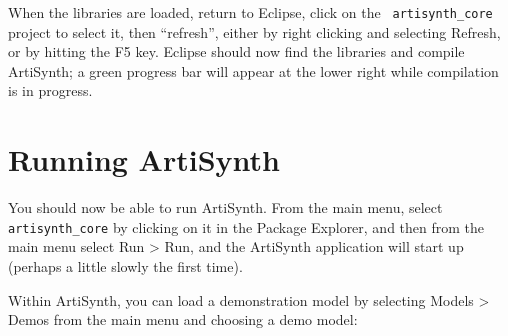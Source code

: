 When the libraries are loaded, return to Eclipse, click on the {\tt
artisynth\_core} project to select it, then ``refresh'', either by
right clicking and selecting {\sf Refresh}, or by hitting the {\sf F5}
key. Eclipse should now find the libraries and compile ArtiSynth; a
green progress bar will appear at the lower right while compilation is
in progress.

\section{Running ArtiSynth}

You should now be able to run ArtiSynth. From the main menu, select
{\tt artisynth\_core} by clicking on it in the Package Explorer, and
then from the main menu select {\sf Run > Run}, and the ArtiSynth
application will start up (perhaps a little slowly the first time).


Within ArtiSynth, you can load a demonstration model by selecting
{\sf Models > Demos} from the main menu and choosing a demo model:

